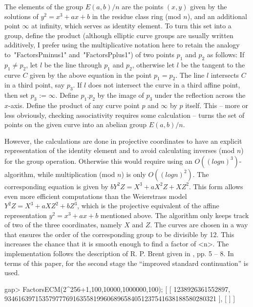 The elements of the group $E(a,b)/n$ are the points $(x,y)$ given by the
solutions of $y^2 = x^3 + ax + b$ in the residue class ring (mod $n$),
and an additional point $\infty$ at infinity, which serves as
identity element.
To turn this set into a group, define the product
(although elliptic curve groups are usually written additively,
I prefer using the multiplicative notation here to retain the analogy
to~"FactorsPminus1" and~"FactorsPplus1") of two points
$p_1$ and $p_2$ as follows:
If $p_1 \neq p_2$, let $l$ be the line through $p_1$ and $p_2$,
otherwise let $l$ be the tangent to the curve $C$ given by the
above equation in the point $p_1 = p_2$.
The line $l$ intersects $C$ in a third point, say $p_3$.
If $l$ does not intersect the curve in a
third affine point, then set $p_3$ := $\infty$.
Define $p_1.p_2$ by the image of $p_3$ under
the reflection across the $x$-axis.
Define the product of any curve point $p$ and $\infty$ by $p$ itself.
This -- more or less obviously, checking associativity requires some
calculation -- turns the set of points on the given curve
into an abelian group $E(a,b)/n$.

However, the calculations are done in
projective coordinates to have an explicit representation of the
identity element and to avoid calculating inverses (mod $n$)
for the group operation. Otherwise this would require using an
$O((log n)^3)$-algorithm, while multiplication (mod $n$) is only
$O((log n)^2)$. The corresponding equation is given by
$bY^2Z = X^3 + aX^2Z + XZ^2$. This form allows even more efficient
computations than the
Weierstrass model 
$Y^2Z = X^3 + aXZ^2 + bZ^3$, which is the projective equivalent of
the affine representation $y^2 = x^3 + ax + b$ mentioned above.
The algorithm only keeps track of two of the three coordinates,
namely $X$ and $Z$.
The curves are chosen in a way that ensures the order of
the corresponding group to be divisible by 12. This increases the
chance that it is smooth enough to find a factor of <n>.
The implementation follows the description of R. P. Brent given in
\cite{Brent96}, pp. 5 -- 8. In terms of this paper,
for the second stage the ``improved standard continuation'' is used.

\beginexample
gap> FactorsECM(2^256+1,100,10000,1000000,100);
[ [ 1238926361552897, 
      93461639715357977769163558199606896584051237541638188580280321 ], [  ] ]
\endexample


